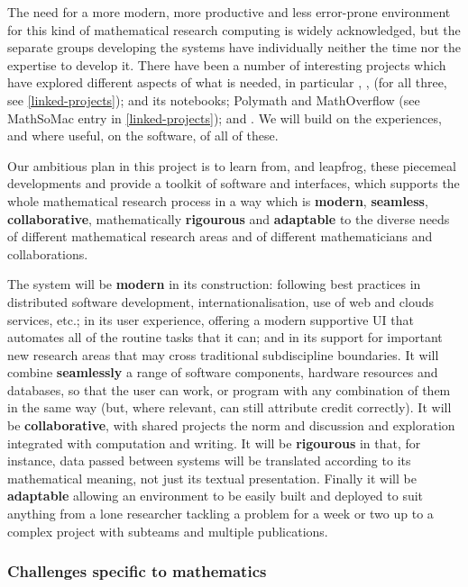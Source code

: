 The need for a more modern, more productive and less error-prone
environment for this kind of mathematical research computing is widely
acknowledged, but the separate groups developing the systems have
individually neither the time nor the expertise to develop it. There
have been a number of interesting projects which have explored
different aspects of what is needed, in particular
\SMC, \HPCGAP, \scienceproject (for all three, see \ref{linked-projects});
\Sage and its notebooks;
Polymath and MathOverflow (see MathSoMac entry in \ref{linked-projects});
and .
We will build on the experiences, and where useful, on the software, of all of these.

Our ambitious plan in this project is to learn from, and leapfrog,
these piecemeal developments and provide a toolkit of software and
interfaces, which supports the whole mathematical research process in
a way which is \textbf{modern}, \textbf{seamless},
\textbf{collaborative}, mathematically \textbf{rigourous} and
\textbf{adaptable} to the diverse needs of different mathematical
research areas and of different mathematicians and collaborations.

The system will be \textbf{modern} in its construction: following
best practices in distributed software development,
internationalisation, use of web and clouds services, etc.; in its user
experience, offering a modern supportive UI that automates all of the
routine tasks that it can; and in its support for important new
research areas that may cross traditional subdiscipline boundaries. It
will combine \textbf{seamlessly} a range of software components,
hardware resources and databases, so that the user can work, or
program with any combination of them in the same way (but, where
relevant, can still attribute credit correctly). It will be
\textbf{collaborative}, with shared projects the norm and discussion
and exploration integrated with computation and writing. It will be
\textbf{rigourous} in that, for instance, data passed between systems
will be translated according to its mathematical meaning, not just its
textual presentation. Finally it will be \textbf{adaptable} allowing
an environment to be easily built and deployed to suit anything
from a lone researcher tackling a problem for a week or two up to a
complex project with subteams and multiple publications.
  

\subsubsection{Challenges specific to  mathematics}

